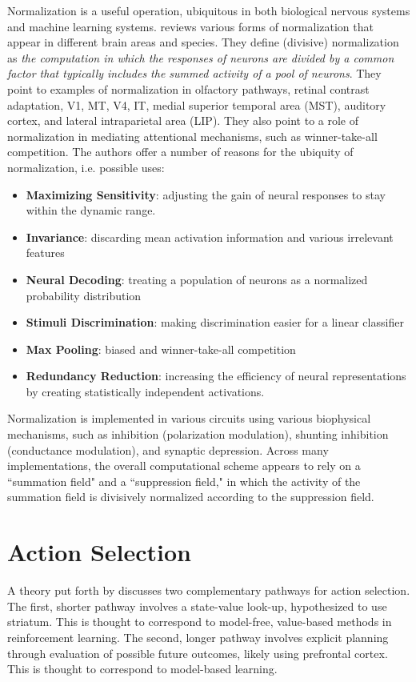 Normalization is a useful operation, ubiquitous in both biological nervous systems and machine learning systems. \cite{carandini2012normalization} reviews various forms of normalization that appear in different brain areas and species. They define (divisive) normalization as \textit{the computation in which the responses of neurons are divided by a common factor that typically includes the summed activity of a pool of neurons}. They point to examples of normalization in olfactory pathways, retinal contrast adaptation, V1, MT, V4, IT, medial superior temporal area (MST), auditory cortex, and lateral intraparietal area (LIP). They also point to a role of normalization in mediating attentional mechanisms, such as winner-take-all competition. The authors offer a number of reasons for the ubiquity of normalization, i.e. possible uses:
\begin{itemize}
	\item \textbf{Maximizing Sensitivity}: adjusting the gain of neural responses to stay within the dynamic range.
	\item \textbf{Invariance}: discarding mean activation information and various irrelevant features
	\item \textbf{Neural Decoding}: treating a population of neurons as a normalized probability distribution
	\item \textbf{Stimuli Discrimination}: making discrimination easier for a linear classifier
	\item \textbf{Max Pooling}: biased and winner-take-all competition
	\item \textbf{Redundancy Reduction}: increasing the efficiency of neural representations by creating statistically independent activations.
\end{itemize}
Normalization is implemented in various circuits using various biophysical mechanisms, such as inhibition (polarization modulation), shunting inhibition (conductance modulation), and synaptic depression. Across many implementations, the overall computational scheme appears to rely on a ``summation field" and a ``suppression field," in which the activity of the summation field is divisively normalized according to the suppression field.


\section{Action Selection}

A theory put forth by \cite{daw2005uncertainty} discusses two complementary pathways for action selection. The first, shorter pathway involves a state-value look-up, hypothesized to use striatum. This is thought to correspond to model-free, value-based methods in reinforcement learning. The second, longer pathway involves explicit planning through evaluation of possible future outcomes, likely using prefrontal cortex. This is thought to correspond to model-based learning.
